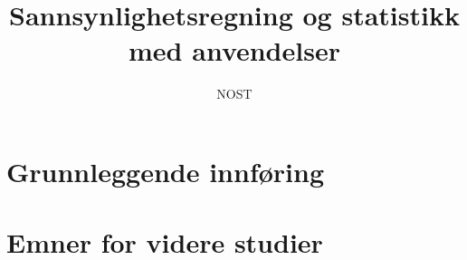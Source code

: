\documentclass[oneside,norsk,11pt]{book}
\title{Sannsynlighetsregning og statistikk med anvendelser}
\author{NOST}
\begin{document}


\maketitle
 

\tableofcontents
\mainmatter
\part{Grunnleggende innføring}
 
 
 
 
 
 
 
 

\part{Emner for videre studier}
 
 
 
 
 
 
 
 
 

\appendix
 
 

 
\printindex
\end{document}
